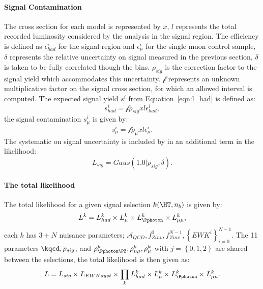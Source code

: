 \paragraph{Signal Contamination} %
\label{par:signal_contamination}
The cross section for each model is represented by $x$, $l$ represents the 
total recorded luminosity considered by the analysis in the signal region. The 
efficiency is defined as $\epsilon^{i}_{had}$ for the signal region and 
$\epsilon^{i}_{\mu}$ for the single muon control sample, $\delta$ represents 
the relative uncertainty on signal measured in the previous section, $\delta$ 
is taken to be fully correlated though the \HT bins. $\rho_{sig}$ is the 
correction factor to the signal yield which accommodates this uncertainty. 
$\mathcal{f}$ represents an unknown multiplicative factor on the signal cross 
section, for which an allowed interval is computed.
The expected signal yield $s^{i}$ from Equation~\eqref{eqn:l_had} is defined as:
\begin{equation}
  s^{i}_{had} = \mathcal{f}\rho_{sig}xl\epsilon_{had}^{i},
  \label{eqn:sihad}
\end{equation}
the signal contamination $s^{i}_{\mu}$ is given by:
\begin{equation}
  s^{i}_{\mu} = \mathcal{f}\rho_{\mu}xl\epsilon_{\mu}^{i}.
  \label{eqn:simu}
\end{equation}
The systematic on signal uncertainty is included by in an additional term in 
the likelihood:
\begin{equation}
  L_{sig} = Gaus\left(1.0|\rho_{sig},\delta \right).
\end{equation}
\paragraph{The total likelihood} %
\label{par:the_total_likelihood}
The total likelihood for a given signal selection $k(\HT,n_b)$ is given by:
\begin{equation}
  L^{k} = L^{k}_{had}\times L^{k}_{\mu} \times L_{\Pphoton}^{k} \times L_{\mu\mu}^{k},
  \label{eqn:totallikelihood}
\end{equation}
each $k$ has $3+N$ nuisance parameters; $\mathcal{A}_{QCD}, f^{0}_{Zinv}, 
f^{N-1}_{Zinv}, \left\{EWK^{i}\right\}^{N-1}_{i=0}$. The 11 parameters $\kqcd, 
\rho_{sig}$, and $\rho_{\Pphoton\PZ}^{k}, \rho_{\mu\mu}^{k}, \rho_{\mu}^{k}$ 
with $j = \left\{0,1,2 \right\}$ are shared between the selections, the total 
likelihood is then given as:
\begin{equation}
  L = L_{sig} \times L_{EWK syst} \times \prod_{k} L^{k}_{had} \times L^{k}_{\mu} \times L^{k}_{\Pphoton} \times L^{k}_{\mu\mu}.
\end{equation}

